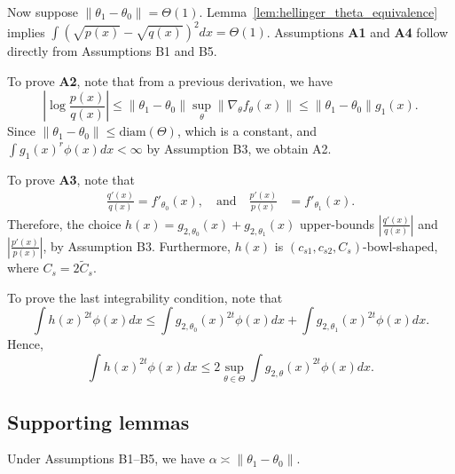 \documentclass{article}
\begin{document}
Now suppose $\| \theta_1 - \theta_0 \| = \Theta(1)$. Lemma~\ref{lem:hellinger_theta_equivalence} implies $\int (\sqrt{p(x)} - \sqrt{q(x)})^2 dx = \Theta(1)$. Assumptions \textbf{A1} and \textbf{A4} follow directly from Assumptions B1 and B5. 

To prove \textbf{A2}, note that from a previous derivation, we have
\[
\left | \log \frac{p(x)}{q(x)} \right | 
                \leq  \| \theta_1 - \theta_0 \| \sup_\theta \| \nabla_{\theta} f_{\theta} (x) \| \leq 
     \| \theta_1 - \theta_0 \| g_1(x).
\]
Since $\|\theta_1 - \theta_0\| \leq \textrm{diam}(\Theta)$, which is a constant, and $\int g_1(x)^r \phi(x) dx < \infty$ by Assumption B3, we obtain A2.

To prove \textbf{A3}, note that
\begin{align*}
\frac{q'(x)}{q(x)} = f'_{\theta_0}(x), \quad \text{and} \quad \frac{p'(x)}{p(x)} &= f'_{\theta_1}(x).
\end{align*}
Therefore, the choice $h(x) = g_{2, \theta_0}(x) + g_{2, \theta_1}(x)$ upper-bounds $\left| \frac{q'(x)}{q(x)} \right|$ and 
$\left| \frac{p'(x)}{p(x)} \right|$, by Assumption B3. Furthermore, $h(x)$ is $(c_{s1}, c_{s2}, C_s)$-bowl-shaped, where $C_s = 2 \tilde{C}_s$. 

To prove the last integrability condition, note that
\[
 \int h(x)^{2t} \phi(x) dx \leq \int g_{2, \theta_0}(x)^{2t} \phi(x) dx  + \int g_{2, \theta_1}(x)^{2t} \phi(x) dx.
\]
Hence, 
\[
\int h(x)^{2t} \phi(x) dx \leq 2 \sup_{\theta \in \Theta} \int g_{2, \theta}(x)^{2t} \phi(x) dx.
\]



\subsection{Supporting lemmas}

\begin{lemma}
\label{lem:chi_square_theta_equivalence}
Under Assumptions B1--B5, we have
$\alpha \asymp \| \theta_1 - \theta_0 \|$.
\end{lemma}
\end{document}

